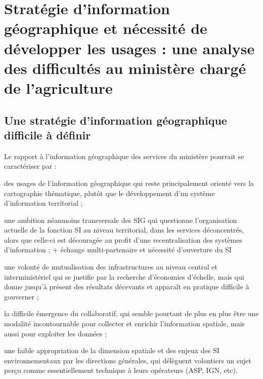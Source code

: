 \section[constats]
{Stratégie d'information géographique et nécessité de développer
les usages : une analyse des difficultés au ministère chargé de l'agriculture}


\subsection[constats:strategie]
{Une stratégie d'information géographique difficile à définir}


Le rapport à l'information géographique des services du ministère
pourrait se caractériser par :

\startitemize

\item des usages de l'information géographique
      qui reste principalement orienté vers la cartographie thématique,
      plutôt que le développement d'un système d'information territorial ;

\item une ambition néanmoins transversale des SIG qui questionne
      l'organisation actuelle de la fonction SI au niveau territorial,
      dans les services déconcentrés, alors que celle-ci est découragée
      au profit d'une recentralisation des systèmes d'information ; 
      + échange multi-partenaire et nécessité d'ouverture du SI     

\item une volonté de mutualisation des infrastructures au niveau central et interministériel
      qui se justifie par la recherche d'économies d'échelle,
      mais qui donne jusqu'à présent des résultats décevants
      et apparaît en pratique difficile à gouverner ;

\item la difficile émergence du collaboratif,
      qui semble pourtant de plus en plus être une modalité incontournable
      pour collecter et enrichir l'information spatiale,
      mais aussi pour exploiter les données ;

\item une faible appropriation de la dimension spatiale
      et des enjeux des SI environnementaux
      par les directions générales,
      qui délèguent volontiers un sujet perçu comme essentiellement
      technique à leurs opérateurs (ASP, IGN, etc).

\stopitemize

